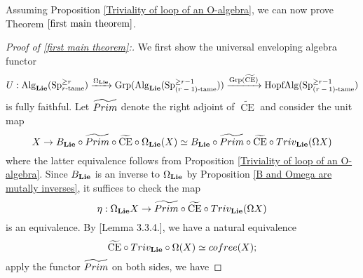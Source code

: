 Assuming Proposition \ref{Triviality of loop of an O-algebra}, we can now prove Theorem $\ref{first main theorem}$.
\begin{proof}
[Proof of  \ref{first main theorem}:]
	We first show the universal enveloping algebra functor
	\[
	U:
	\operatorname{Alg}_{\mathbf{Lie}}(\operatorname{Sp}^{\geq r}_{\text{$r$-tame}}) 
	\xrightarrow{\Omega_{\mathbf{Lie}}}
	\operatorname{Grp}(\operatorname{Alg}_{\mathbf{Lie}}(\operatorname{Sp}^{\geq r-1}_{\text{($r-1$)-tame}}))
	\xrightarrow{\operatorname{Grp}(\widetilde{\operatorname{CE}})}
	\operatorname{HopfAlg}(\operatorname{Sp}^{\geq r-1}_{\text{($r-1$)-tame}})
	\]
	is fully faithful. 
    Let $\widetilde{Prim}$ denote the right adjoint of $\widetilde{\operatorname{CE}}$ and consider the unit map
	$$
	X \to B_{\mathbf{Lie}}\circ \widetilde{Prim} \circ \widetilde{\operatorname{CE}}\circ \Omega_{\mathbf{Lie}}(X)
	\simeq
	B_{\mathbf{Lie}}\circ
	\widetilde{Prim} \circ \widetilde{\operatorname{CE}}\circ Triv_{\mathbf{Lie}}(\Omega X)
	$$
where the latter equivalence follows from Proposition \ref{Triviality of loop of an O-algebra}. Since $B_{\mathbf{Lie}}$ is an inverse to $\Omega_{\mathbf{Lie}}$ by Proposition \ref{B and Omega are mutally inverses}, it suffices to check the map
\[
\eta: \Omega_{\mathbf{Lie}}X \to \widetilde{Prim} \circ \widetilde{\operatorname{CE}}\circ Triv_{\mathbf{Lie}}(\Omega X)
\]
is an equivalence.
%	
	By \cite{Francis-Gaitsgory}[Lemma 3.3.4.], we have a natural equivalence 
	$$\widetilde{\operatorname{CE}}\circ Triv_{\mathbf{Lie}}\circ \Omega (X) 
	\simeq 
	cofree(X);
	$$ 
	apply the functor $\widetilde{Prim}$ on both sides, we have
	

\end{proof}

